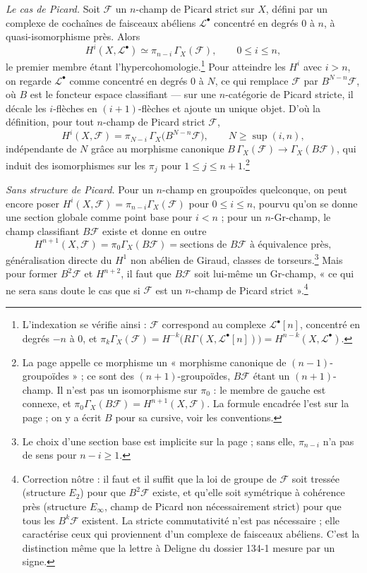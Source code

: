 \documentclass[11pt,a4paper]{article}
\begin{document}
\emph{Le cas de Picard.} Soit $\mathcal{F}$ un $n$-champ de Picard strict sur
$X$, défini par un complexe de cochaînes de faisceaux abéliens
$\mathcal{L}^\bullet$ concentré en degrés $0$ à $n$, à quasi-isomorphisme
près. Alors
\[
H^i(X,\mathcal{L}^\bullet) \simeq \pi_{n-i}\,\Gamma_X(\mathcal{F}), \qquad 0 \leqslant i \leqslant n,
\]
le premier membre étant l'hypercohomologie.\footnote{L'indexation se
vérifie ainsi : $\mathcal{F}$ correspond au complexe $\mathcal{L}^\bullet[n]$,
concentré en degrés $-n$ à $0$, et
$\pi_k\Gamma_X(\mathcal{F}) = H^{-k}\bigl(R\Gamma(X,\mathcal{L}^\bullet[n])\bigr)
= H^{n-k}(X,\mathcal{L}^\bullet)$.} Pour atteindre les $H^i$ avec
$i > n$, on regarde $\mathcal{L}^\bullet$ comme concentré en degrés $0$ à
$N$, ce qui remplace $\mathcal{F}$ par $B^{N-n}\mathcal{F}$, où $B$ est le
foncteur espace classifiant --- sur une $n$-catégorie de Picard stricte, il
décale les $i$-flèches en $(i+1)$-flèches et ajoute un unique objet. D'où
la définition, pour tout $n$-champ de Picard strict $\mathcal{F}$,
\[
\boxed{\;H^i(X,\mathcal{F}) = \pi_{N-i}\,\Gamma_X\bigl(B^{N-n}\mathcal{F}\bigr), \qquad N \geqslant \sup(i,n),\;}
\]
indépendante de $N$ grâce au morphisme canonique
$B\,\Gamma_X(\mathcal{F}) \to \Gamma_X(B\mathcal{F})$, qui induit des
isomorphismes sur les $\pi_j$ pour $1 \leqslant j \leqslant
n+1$.\footnote{La page appelle ce morphisme un « morphisme canonique de
$(n-1)$-groupoïdes » ; ce sont des $(n+1)$-groupoïdes, $B\mathcal{F}$ étant
un $(n+1)$-champ. Il n'est pas un isomorphisme sur $\pi_0$ : le membre de
gauche est connexe, et $\pi_0\Gamma_X(B\mathcal{F}) = H^{n+1}(X,\mathcal{F})$.
La formule encadrée l'est sur la page ; on y a écrit $B$ pour sa cursive,
voir les conventions.}

\emph{Sans structure de Picard.} Pour un $n$-champ en groupoïdes quelconque,
on peut encore poser $H^i(X,\mathcal{F}) = \pi_{n-i}\Gamma_X(\mathcal{F})$
pour $0 \leqslant i \leqslant n$, pourvu qu'on se donne une section globale
comme point base pour $i < n$ ; pour un $n$-Gr-champ, le champ classifiant
$B\mathcal{F}$ existe et donne en outre
\[
H^{n+1}(X,\mathcal{F}) = \pi_0\Gamma_X(B\mathcal{F}) = \text{sections de } B\mathcal{F} \text{ à équivalence près},
\]
généralisation directe du $H^1$ non abélien de Giraud, classes de
torseurs.\footnote{Le choix d'une section base est implicite sur la page ;
sans elle, $\pi_{n-i}$ n'a pas de sens pour $n-i \geqslant 1$.} Mais pour
former $B^2\mathcal{F}$ et $H^{n+2}$, il faut que $B\mathcal{F}$ soit
lui-même un Gr-champ, « ce qui ne sera sans doute le cas que si
$\mathcal{F}$ est un $n$-champ de Picard strict ».\footnote{Correction
nôtre : il faut et il suffit que la loi de groupe de $\mathcal{F}$ soit
tressée (structure $E_2$) pour que $B^2\mathcal{F}$ existe, et qu'elle soit
symétrique à cohérence près (structure $E_\infty$, champ de Picard non
nécessairement strict) pour que tous les $B^k\mathcal{F}$ existent. La
stricte commutativité n'est pas nécessaire ; elle caractérise ceux qui
proviennent d'un complexe de faisceaux abéliens. C'est la distinction même
que la lettre à Deligne du dossier 134-1 mesure par un signe.}
\end{document}
